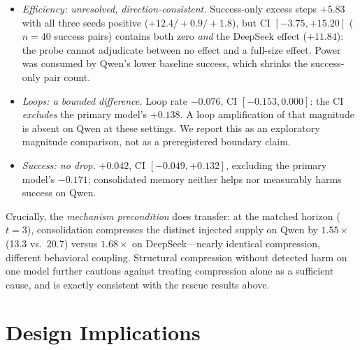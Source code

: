 \documentclass[11pt]{article}
\begin{document}
\begin{itemize}[leftmargin=1.6em]
\item \emph{Efficiency: unresolved, direction-consistent.} Success-only excess steps
$+5.83$ with all three seeds positive ($+12.4/+0.9/+1.8$), but CI $[-3.75, +15.20]$
($n{=}40$ success pairs) contains both zero \emph{and} the DeepSeek effect ($+11.84$): the
probe cannot adjudicate between no effect and a full-size effect. Power was consumed by
Qwen's lower baseline success, which shrinks the success-only pair count.
\item \emph{Loops: a bounded difference.} Loop rate $-0.076$, CI $[-0.153, 0.000]$: the CI
\emph{excludes} the primary model's $+0.138$. A loop amplification of that magnitude is
absent on Qwen at these settings. We report this as an exploratory magnitude comparison, not
as a preregistered boundary claim.
\item \emph{Success: no drop.} $+0.042$, CI $[-0.049, +0.132]$, excluding the primary model's
$-0.171$; consolidated memory neither helps nor measurably harms success on Qwen.
\end{itemize}

Crucially, the \emph{mechanism precondition} does transfer: at the matched horizon
($t{=}3$), consolidation compresses the distinct injected supply on Qwen by $1.55\times$
(13.3 vs.\ 20.7) versus $1.68\times$ on DeepSeek---nearly identical compression, different
behavioral coupling. Structural compression without detected harm on one model further
cautions against treating compression alone as a sufficient cause, and is exactly consistent
with the rescue results above.


\section{Design Implications}
\end{document}
